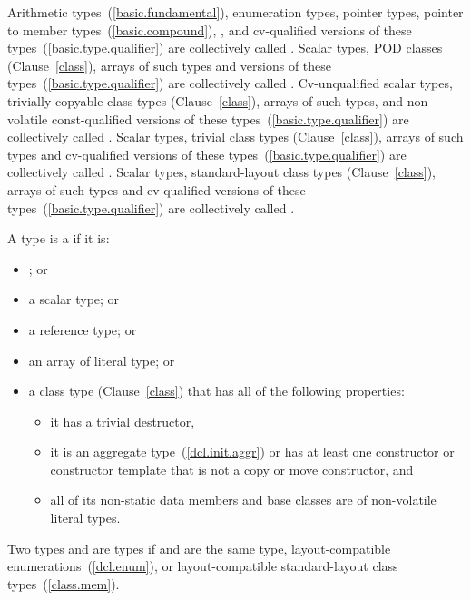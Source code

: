 \pnum
Arithmetic types~(\ref{basic.fundamental}), enumeration types, pointer
types, pointer to member types~(\ref{basic.compound}),
,
and
cv-qualified versions of these
types~(\ref{basic.type.qualifier}) are collectively called
%
. Scalar types,
POD classes (Clause~\ref{class}), arrays of such types and
 versions of these
types~(\ref{basic.type.qualifier}) are collectively called
%
.
Cv-unqualified scalar types, trivially copyable class types (Clause~\ref{class}), arrays of
such types, and non-volatile const-qualified versions of these
types~(\ref{basic.type.qualifier}) are collectively called .
Scalar types, trivial class types (Clause~\ref{class}),
arrays of such types and cv-qualified versions of these
types~(\ref{basic.type.qualifier}) are collectively called
. Scalar types, standard-layout class
types (Clause~\ref{class}), arrays of such types and
cv-qualified versions of these types~(\ref{basic.type.qualifier})
are collectively called .

\pnum
A type is a  if it is:

\begin{itemize}
\item {}; or
\item a scalar type; or
\item a reference type; or
\item an array of literal type; or
\item a class type (Clause~\ref{class}) that
has all of the following properties:
\begin{itemize}
\item it has a trivial destructor,
\item it is an aggregate type~(\ref{dcl.init.aggr}) or has
at least one  constructor or constructor template that is not a copy or move constructor, and
\item all of its non-static data members and base classes are
of non-volatile literal types.
\end{itemize}
\end{itemize}

\pnum
{}%
Two types   and   are
 types
if  and  are the same type,
layout-compatible enumerations~(\ref{dcl.enum}), or
layout-compatible standard-layout class types~(\ref{class.mem}).

